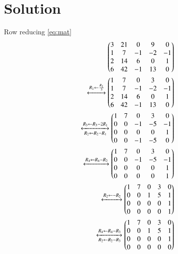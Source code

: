 \documentclass[journal,12pt,twocolumn]{IEEEtran}
\begin{document}
\section{Solution}
Row reducing \eqref{eq:mat}
\begin{align}
\begin{pmatrix}3&21&0&9&0\\1&7&-1&-2&-1\\2&14&6&0&1\\6&42&-1&13&0\end{pmatrix} \nonumber\\
\xleftrightarrow[]{R_1\leftarrow\frac{R_1}{3}}
\begin{pmatrix}1&7&0&3&0\\1&7&-1&-2&-1\\2&14&6&0&1\\6&42&-1&13&0\end{pmatrix} \nonumber \\
\xleftrightarrow[R_2\leftarrow R_2-R_1]{R_3\leftarrow R_3-2R_1}\begin{pmatrix}1&7&0&3&0\\0&0&-1&-5&-1\\0&0&0&0&1\\0&0&-1&-5&0\end{pmatrix}  \nonumber\\
\xleftrightarrow[]{R_4\leftarrow R_4-R_2}\begin{pmatrix}1&7&0&3&0\\0&0&-1&-5&-1\\0&0&0&0&1\\0&0&0&0&1\end{pmatrix}  \nonumber\\
\xleftrightarrow[]{R_2\leftarrow -R_2}\begin{pmatrix}1&7&0&3&0\\0&0&1&5&1\\0&0&0&0&1\\0&0&0&0&1\end{pmatrix}  \nonumber\\
\xleftrightarrow[R_2\leftarrow R_2-R_3]{R_4\leftarrow R_4-R_3}\begin{pmatrix}1&7&0&3&0\\0&0&1&5&1\\0&0&0&0&1\\0&0&0&0&0\end{pmatrix} \label{eq:rref}
\end{align}
\end{document}
